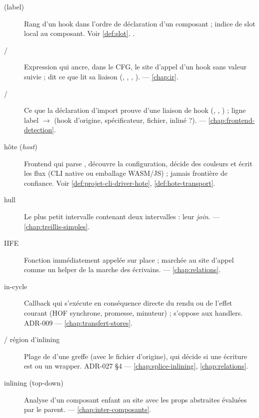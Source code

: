 \begin{description}
\item[ (label)] Rang  d'un hook dans l'ordre de déclaration d'un composant ; indice de slot local au composant. Voir \cref{def:slot}. .

\item[ / ] Expression qui ancre, dans le CFG, le site d'appel d'un hook sans valeur suivie ;  dit ce que lit sa liaison (, , , ).  — \cref{chap:ir}.

\item[ / ] Ce que la déclaration d'import prouve d'une liaison de hook (, , ) ; ligne \og label \(\to\) (hook d'origine, spécificateur, fichier, inliné ?)\fg{}.  — \cref{chap:frontend-detection}.

\item[hôte (\emph{host})] Frontend qui parse , découvre la configuration, décide des couleurs et écrit les flux (CLI native ou emballage WASM/JS) ; jamais frontière de confiance. Voir \cref{def:projet-cli-driver-hote}, \cref{def:hote-transport}.

\item[hull] Le plus petit intervalle contenant deux intervalles : leur \emph{join}.
 — \cref{chap:treillis-simples}.

\item[IIFE] Fonction immédiatement appelée sur place ; marchée au site d'appel comme un helper de la marche des écrivains.  — \cref{chap:relations}.

\item[in-cycle] Callback qui s'exécute en conséquence directe du rendu ou de l'effet courant (HOF synchrone, promesse, minuteur) ; s'oppose aux handlers. ADR-009 — \cref{chap:transfert-stores}.

\item[ / région d'inlining] Plage de  d'une greffe (avec le fichier d'origine), qui décide si une écriture est  ou  un wrapper. ADR-027 §4 — \cref{chap:splice-inlining}, \cref{chap:relations}.

\item[inlining (top-down)] Analyse d'un composant enfant au site  avec les props abstraites évaluées par le parent.  — \cref{chap:inter-composants}.


\end{description}
